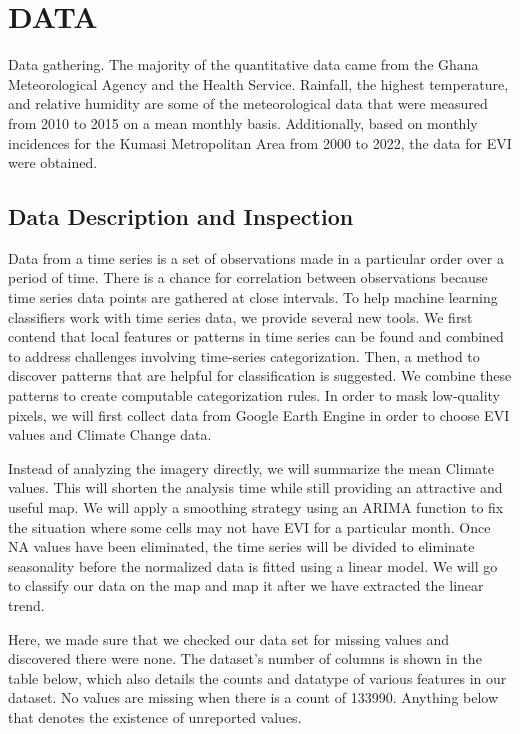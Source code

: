 \section{DATA }
Data gathering. The majority of the quantitative data came from the Ghana Meteorological Agency and the Health Service. Rainfall, the highest temperature, and relative humidity are some of the meteorological data that were measured from 2010 to 2015 on a mean monthly basis. Additionally, based on monthly incidences for the Kumasi Metropolitan Area from 2000 to 2022, the data for EVI were obtained.

\subsection{Data Description and Inspection}

Data from a time series is a set of observations made in a particular order over a period of time. There is a chance for correlation between observations because time series data points are gathered at close intervals. To help machine learning classifiers work with time series data, we provide several new tools. We first contend that local features or patterns in time series can be found and combined to address challenges involving time-series categorization. Then, a method to discover patterns that are helpful for classification is suggested. We combine these patterns to create computable categorization rules. In order to mask low-quality pixels, we will first collect data from Google Earth Engine in order to choose  EVI values and Climate Change data.

Instead of analyzing the imagery directly, we will summarize the mean  Climate values. This will shorten the analysis time while still providing an attractive and useful map. We will apply a smoothing strategy using an ARIMA function to fix the situation where some cells may not have  EVI for a particular month. Once NA values have been eliminated, the time series will be divided to eliminate seasonality before the normalized data is fitted using a linear model. We will go to classify our data on the map and map it after we have extracted the linear trend.

Here, we made sure that we checked our data set for missing values and discovered there were none. The dataset’s number of columns is shown in the table below,
which also details the counts and datatype of various features in our dataset. No values are missing when there is a count of 133990. Anything below that denotes
the existence of unreported values.


